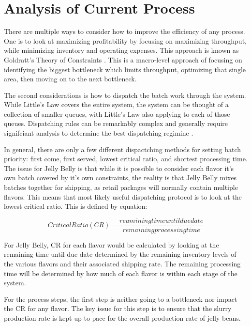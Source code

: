 \section{Analysis of Current Process}

There are multiple ways to consider how to improve the efficiency of any process. One is to look at maximizing profitability by focusing on maximizing throughput, while minimizing inventory and operating expenses. This approach is known as Goldratt's Theory of Constraints \parencite[][p. 320]{schroederOperationsManagementContemporary2010}. This is a macro-level approach of focusing on identifying the biggest bottleneck which limits throughput, optimizing that single area, then moving on to the next bottleneck.

The second considerations is how to dispatch the batch work through the system. While Little's Law covers the entire system, the system can be thought of a collection of smaller queues, with Little's Law also applying to each of those queues. Dispatching rules can be remarkably complex and generally require signifciant analysis to determine the best dispatching regimine \parencite{oukilRankingDispatchingRules2019}.

In general, there are only a few different dispactching methods for setting batch priority: first come, first served, lowest critical ratio, and shortest processing time. The issue for Jelly Belly is that while it is possible to consider each flavor it's own batch covered by it's own constraints, the reality is that Jelly Belly mixes batches together for shipping, as retail packages will normally contain multiple flavors. This means that most likely useful dispatching protocol is to look at the lowest critical ratio. This is defined by equation:

\begin{equation}
  Critical Ratio (CR) = \frac{reamining time until due date}{remaining processing time}
\end{equation}

For Jelly Belly, CR for each flavor would be calculated by looking at the remaining time until due date determined by the remaining inventory levels of the various flavors and their associated shipping rate. The remaining processing time will be determined by how much of each flavor is within each stage of the system.

For the process steps, the first step is neither going to a bottleneck nor impact the CR for any flavor. The key issue for this step is to ensure that the slurry production rate is kept up to pace for the overall production rate of jelly beans.

